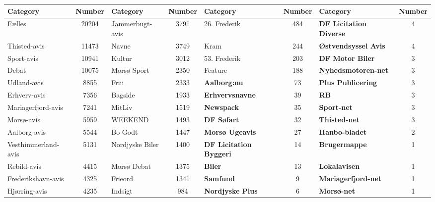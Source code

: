 \begin{table*}[h]
	\centering
	\begin{tabular}{l|c|l|c|l|c|l|c}
		Category            & Number & Category        & Number & Category                       & Number & Category                       & Number \\
		\toprule
		Fælles              & 20204  & Jammerbugt-avis &  3791  & 26. Frederik                   &  484   & \textbf{DF Licitation Diverse} &   4    \\
		Thisted-avis        & 11473  & Navne           &  3749  & Kram                           &  244   & \textbf{Østvendsyssel Avis}    &   4    \\
		Sport-avis          & 10941  & Kultur          &  3012  & 53. Frederik                   &  203   & \textbf{DF Motor Biler}        &   3    \\
		Debat               & 10075  & Morsø Sport     &  2350  & Feature                        &  188   & \textbf{Nyhedsmotoren-net}     &   3    \\
		Udland-avis         &  8855  & Friii           &  2333  & \textbf{Aalborg:nu}            &   73   & \textbf{Plus Publicering}      &   3    \\
		Erhverv-avis        &  7356  & Bagside         &  1933  & \textbf{Erhvervsnavne}         &   39   & \textbf{RB}                    &   3    \\
		Mariagerfjord-avis  &  7241  & MitLiv          &  1519  & \textbf{Newspack}              &   35   & \textbf{Sport-net}             &   3    \\
		Morsø-avis          &  5959  & WEEKEND         &  1493  & \textbf{DF Søfart}             &   32   & \textbf{Thisted-net}           &   3    \\
		Aalborg-avis        &  5544  & Bo Godt         &  1447  & \textbf{Morsø Ugeavis}         &   27   & \textbf{Hanbo-bladet}          &   2    \\
		Vesthimmerland-avis &  5131  & Nordjyske Biler &  1400  & \textbf{DF Licitation Byggeri} &   14   & \textbf{Brugermappe}           &   1    \\
		Rebild-avis         &  4415  & Morsø Debat     &  1375  & \textbf{Biler}                 &   13   & \textbf{Lokalavisen}           &   1    \\
		Frederikshavn-avis  &  4325  & Frieord         &  1341  & \textbf{Samfund}               &   9    & \textbf{Mariagerfjord-net}     &   1    \\
		Hjørring-avis       &  4235  & Indsigt         &  984   & \textbf{Nordjyske Plus}        &   6    & \textbf{Morsø-net}             &   1    \\

\end{tabular}
\end{table*}
